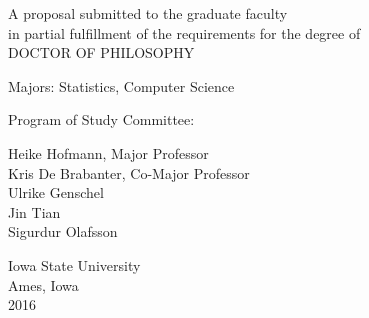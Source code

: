 \begin{center}

A proposal submitted to the graduate faculty \\ in partial fulfillment of the requirements for the degree of \\ DOCTOR OF PHILOSOPHY

\vspace{1in}

Majors: Statistics, Computer Science

\vspace{.5in}

Program of Study Committee:

Heike Hofmann, Major Professor \\
Kris De Brabanter, Co-Major Professor \\
Ulrike Genschel \\
Jin Tian \\
Sigurdur Olafsson

\vspace{.5in}

Iowa State University \\
Ames, Iowa \\
2016

\end{center}

\newpage
